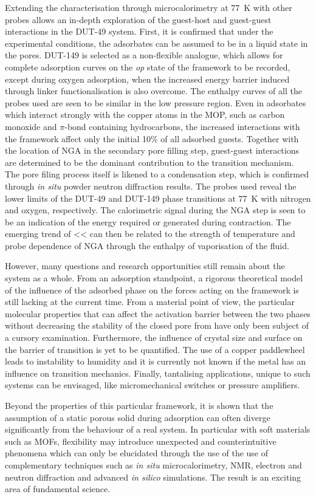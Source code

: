Extending the characterisation through microcalorimetry at \SI{77}{\kelvin}
with other probes allows an in-depth exploration of the guest-host and 
guest-guest interactions in the DUT-49 system. First, it is confirmed 
that under the experimental conditions, the adsorbates can be assumed to 
be in a liquid state in the pores. DUT-149 is selected as a non-flexible 
analogue, which allows for complete adsorption curves on the \textit{op}
state of the framework to be recorded, except during oxygen adsorption,
when the increased energy barrier induced through linker functionalisation
is also overcome. The enthalpy curves of all the probes used are seen to 
be similar in the low pressure region. Even in adsorbates which interact 
strongly with the copper atoms in the \gls{MOP}, such as carbon 
monoxide and \(\pi\)-bond containing hydrocarbons, the 
increased interactions with the 
framework affect only the initial 10\% of all adsorbed guests. Together
with the location of NGA in the secondary pore filling step,
guest-guest interactions are determined to be the dominant contribution 
to the transition mechanism. The pore filing process itself is likened
to a condensation step, which is confirmed through \textit{in situ}
powder neutron diffraction results.
The probes used reveal the lower limits of the DUT-49
and DUT-149 phase transitions at \SI{77}{\kelvin} with nitrogen and 
oxygen, respectively. The calorimetric signal during the NGA step
is seen to be an indication of the energy required or generated 
during contraction. The emerging trend of <<
can then be related to the strength of temperature and probe dependence
of NGA through the enthalpy of vaporisation of the fluid.

However, many questions and research opportunities still remain about the 
system as a whole. From an adsorption standpoint, a rigorous theoretical 
model of the influence of the adsorbed phase on the forces acting on the
framework is still lacking at the current time.
From a material point of view, the particular molecular properties that 
can affect the activation barrier between the two phases without 
decreasing the stability of the closed pore from have only been 
subject of a cursory examination.
Furthermore, the influence of crystal size and surface on the
barrier of transition is yet to be quantified. The use of a copper 
paddlewheel leads to instability to humidity and it is currently
not known if the metal has an influence on transition mechanics.
Finally, tantalising applications, unique to such systems can be 
envisaged, like micromechanical switches or pressure amplifiers.

Beyond the properties of this particular framework, it is shown that 
the assumption of a static porous solid during adsorption can often
diverge significantly from the behaviour of a real system. In particular
with soft materials such as MOFs, flexibility may introduce 
unexpected and counterintuitive phenomena which can only be elucidated 
through the use of the use of complementary techniques such as 
\textit{in situ} microcalorimetry, NMR, electron and neutron diffraction 
and advanced \textit{in silico} simulations. The result is an 
exciting area of fundamental science.

\FloatBarrier%
\pagebreak